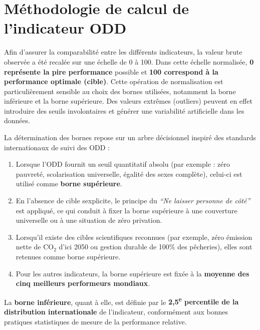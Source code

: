 





\section{Méthodologie de calcul de l'indicateur ODD}

Afin d'assurer la comparabilité entre les différents indicateurs, la valeur brute observée a été recalée sur une échelle de 0 à 100. Dans cette échelle normalisée, \textbf{0 représente la pire performance} possible et \textbf{100 correspond à la performance optimale (cible)}. Cette opération de normalisation est particulièrement sensible au choix des bornes utilisées, notamment la borne inférieure et la borne supérieure. Des valeurs extrêmes (outliers) peuvent en effet introduire des seuils involontaires et générer une variabilité artificielle dans les données.

La détermination des bornes repose sur un arbre décisionnel inspiré des standards internationaux de suivi des ODD :
\begin{simplebox}
\begin{enumerate}
	\item Lorsque l’ODD fournit un seuil quantitatif absolu (par exemple : zéro pauvreté, scolarisation universelle, égalité des sexes complète), celui-ci est utilisé comme \textbf{borne supérieure}.
	\item En l’absence de cible sexplicite, le principe du \textit{``Ne laisser personne de côté''} est appliqué, ce qui conduit à fixer la borne supérieure à une couverture universelle ou à une situation de zéro privation.
	\item Lorsqu’il existe des cibles scientifiques reconnues (par exemple, zéro émission nette de CO$_2$ d’ici 2050 ou gestion durable de 100\% des pêcheries), elles sont retenues comme borne supérieure.
	\item Pour les autres indicateurs, la borne supérieure est fixée à la \textbf{moyenne des cinq meilleurs performeurs mondiaux}.
\end{enumerate}
\end{simplebox}


La \textbf{borne inférieure}, quant à elle, est définie par le \textbf{2,5\textsuperscript{e} percentile de la distribution internationale} de l’indicateur, conformément aux bonnes pratiques statistiques de mesure de la performance relative.

